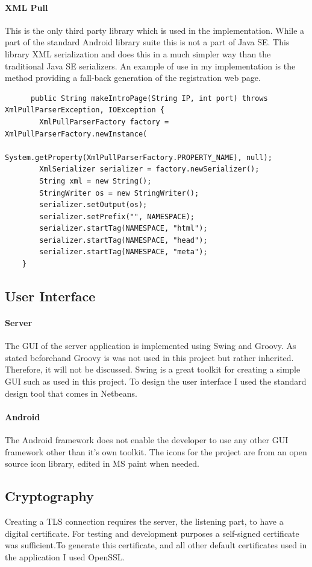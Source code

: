 \documentclass[11pt,twoside,a4paper]{book}
\begin{document}
\paragraph{XML Pull\cite{xmlpull}}
This is the only third party library which is used in the implementation. While a part of the standard Android library suite this is not a part of Java SE. This library XML serialization and does this in a much simpler way than the traditional Java SE serializers. An example of use in my implementation is the method providing a fall-back generation of the registration web page.\\
\begin{lstlisting}
      public String makeIntroPage(String IP, int port) throws XmlPullParserException, IOException {
        XmlPullParserFactory factory = XmlPullParserFactory.newInstance(
                System.getProperty(XmlPullParserFactory.PROPERTY_NAME), null);
        XmlSerializer serializer = factory.newSerializer();
        String xml = new String();
        StringWriter os = new StringWriter();
        serializer.setOutput(os);
        serializer.setPrefix("", NAMESPACE);
        serializer.startTag(NAMESPACE, "html");
        serializer.startTag(NAMESPACE, "head");
        serializer.startTag(NAMESPACE, "meta");
	}
\end{lstlisting}

\subsection{User Interface}
\paragraph{Server}
The GUI of the server application is implemented using Swing and Groovy. As stated beforehand Groovy is was not used in this project but rather inherited. Therefore, it will not be discussed. Swing is a great toolkit for creating a simple GUI such as used in this project. To design the user interface I used the standard design tool that comes in Netbeans.
\paragraph{Android}
The Android framework does not enable the developer to use any other GUI framework other than it's own toolkit. The icons for the project are from an open source icon library\cite{iconsource}, edited in MS paint when needed.

\subsection{Cryptography}
Creating a TLS\cite{tls} connection requires the server, the listening part, to have a digital certificate. For testing and development purposes a self-signed certificate was sufficient.To generate this certificate, and all other default certificates used in the application I used OpenSSL\cite{openssl}.
\end{document}
